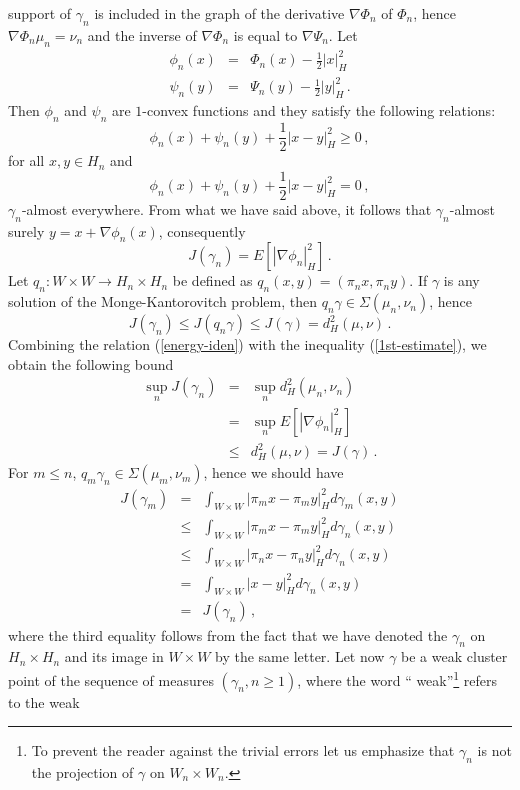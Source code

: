 \documentclass[12pt,a4paper]{book}
\newcommand{\bea}{\begin{eqnarray}}
\newcommand{\eea}{\end{eqnarray}}
\newcommand{\beaa}{\begin{eqnarray*}}
\newcommand{\eeaa}{\end{eqnarray*}}
\newcommand{\ga}{\gamma}
\begin{document}
support of $\ga_n$ is included in the graph of the derivative
$\nabla\Phi_n$  of $\Phi_n$, hence $\nabla\Phi_n\mu_n=\nu_n$ and the inverse of
$\nabla\Phi_n$ is equal to $\nabla\Psi_n$. Let 
\beaa
\phi_n(x)&=&\Phi_n(x)-\frac{1}{2}|x|_H^2\\
\psi_n(y)&=&\Psi_n(y)-\frac{1}{2}|y|_H^2\,.
\eeaa
Then $\phi_n$ and $\psi_n$ are $1$-convex functions and they satisfy
the following relations:
\begin{equation}
\label{+-ineq}
\phi_n(x)+\psi_n(y)+\frac{1}{2}|x-y|_H^2\geq 0\,,
\end{equation}
for all $x,y\in H_n$ and 
\begin{equation}
\label{=-eq}
\phi_n(x)+\psi_n(y)+\frac{1}{2}|x-y|^2_H=0\,,
\end{equation}
$\ga_n$-almost everywhere. From what we have said above, it follows
that $\ga_n$-almost surely  $y=x+\nabla\phi_n(x)$, consequently
\begin{equation}
\label{energy-iden}
J(\ga_n)=E[|\nabla\phi_n|_H^2]\,.
\end{equation}
Let $q_n:W\times W\to H_n\times H_n$ be defined as
$q_n(x,y)=(\pi_nx,\pi_ny)$. If $\ga$ is any solution of the 
Monge-Kantorovitch problem, then $q_n\ga\in \Sigma(\mu_n,\nu_n)$,
hence
\begin{equation}
\label{1st-estimate}
J(\ga_n)\leq J(q_n\ga)\leq J(\ga)=d_H^2(\mu,\nu)\,.
\end{equation}
Combining the relation (\ref{energy-iden}) with the inequality
(\ref{1st-estimate}), we obtain the following bound
\bea
\label{control-ineq}
\sup_nJ(\ga_n)&=&\sup_nd_H^2(\mu_n,\nu_n)\nonumber\\
&=&\sup_nE[|\nabla\phi_n|_H^2]\nonumber\\
&\leq&d_H^2(\mu,\nu)=J(\ga)\,.
\eea
For $m\leq n$, $q_m\ga_n\in\Sigma(\mu_m,\nu_m)$, hence  we should have 
\beaa
J(\ga_m)&=&\int_{W\times W}|\pi_mx-\pi_my|_H^2d\ga_m(x,y)\\
&\leq&\int_{W\times W}|\pi_mx-\pi_my|_H^2d\ga_n(x,y)\\
&\leq&\int_{W\times W}|\pi_nx-\pi_ny|_H^2d\ga_n(x,y)\\
&=&\int_{W\times W}|x-y|_H^2d\ga_n(x,y)\\
&=&J(\ga_n)\,,
\eeaa
where the third equality follows from the fact that we have denoted
the $\ga_n$ on $H_n\times H_n$ and its image in $W\times W$ by the
same letter.
Let now $\ga$ be a weak cluster point of the sequence of measures
$(\ga_n,n\geq 1)$, where the word `` weak''\footnote{To prevent the
  reader against the trivial errors let us emphasize  that $\ga_n$ is
  not the projection of $\ga$ on $W_n\times W_n$.} refers to the weak
\end{document}
